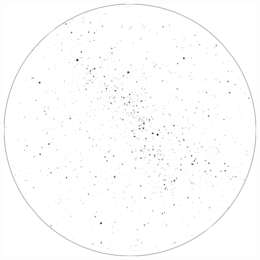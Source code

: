 \documentclass{./SAS-class-skygen}
\begin{document}
	\vspace{0.5cm}
    \begin{center}
    \includegraphics[width=\textwidth]{./pics/skychart10.png}
    \end{center}
    
    
\end{document}
